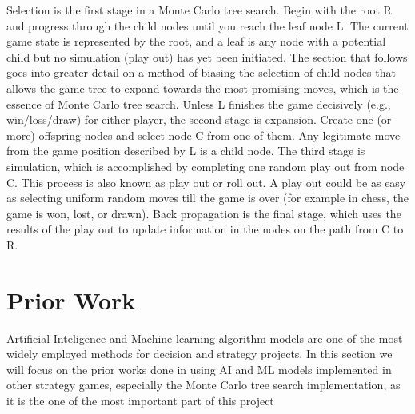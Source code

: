 \documentclass[10pt,twocolumn]{article}
\begin{document}
	Selection is the first stage in a Monte Carlo tree search. Begin with the root R and progress through the child nodes until you reach the leaf node L. The current game state is represented by the root, and a leaf is any node with a potential child but no simulation (play out) has yet been initiated. The section that follows goes into greater detail on a method of biasing the selection of child nodes that allows the game tree to expand towards the most promising moves, which is the essence of Monte Carlo tree search. Unless L finishes the game decisively (e.g., win/loss/draw) for either player, the second stage is expansion.\cite{Report} Create one (or more) offspring nodes and select node C from one of them. Any legitimate move from the game position described by L is a child node. The third stage is simulation, which is accomplished by completing one random play out from node C. This process is also known as play out or roll out. A play out could be as easy as selecting uniform random moves till the game is over (for example in chess, the game is won, lost, or drawn). Back propagation is the final stage, which uses the results of the play out to update information in the nodes on the path from C to R.
	
	
\section{Prior Work}
    Artificial Inteligence and Machine learning algorithm models are one of the most widely employed methods for decision and strategy projects. In this section we will focus on the prior works done in using AI and ML models implemented in other strategy games, especially the Monte Carlo tree search implementation, as it is the one of the most important part of this project 
\end{document}

